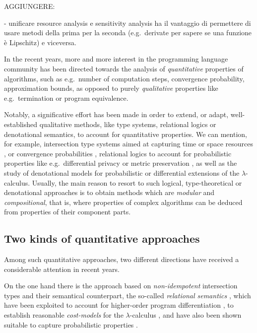 {\color{red}
AGGIUNGERE:

- unificare resource analysis e sensitivity analysis ha il vantaggio di permettere di usare metodi della prima per la seconda (e.g.~derivate per sapere se una funzione è Lipschitz) e viceversa.

}

In the recent years, more and more interest in the programming language community has been directed towards the analysis of \emph{quantitative} properties of algorithms, such as e.g.~number of computation steps, convergence probability, 
approximation bounds, 
as opposed to purely \emph{qualitative} properties like e.g.~termination or program equivalence. 

Notably, a significative effort has been made in order to extend, or adapt, well-established qualitative methods, like type systems, relational logics or denotational semantics, to account for quantitative properties. We can mention, for example, 
intersection type systems aimed at capturing time or space resources \cite{Beniamino}, or convergence probabilities \cite{UgoBreuvart, LICS2022},  relational logics to account for probabilistic properties like e.g.~differential privacy \cite{Barthes} or metric preservation \cite{Reed2010, dallago}, as well as the study of denotational models for 
probabilistic \cite{PCOH, QBS} or differential \cite{difflambda} extensions of the $\lambda$-calculus. 
Usually, the main reason to resort to such logical, type-theoretical or denotational approaches is to obtain methods which are \emph{modular} and \emph{compositional}, that is, where properties of complex algorithms can be deduced from properties of their component parts.   

\subsection{Two kinds of quantitative approaches}

Among such quantitative approaches, two different directions have received a considerable attention in recent years. 

On the one hand there is the approach based on \emph{non-idempotent} intersection types \cite{} and their semantical counterpart, the so-called \emph{relational semantics} \cite{}, which have been exploited to account for higher-order program differentiation \cite{difflambda}, to establish reasonable \emph{cost-models} for the $\lambda$-calculus \cite{}, and have also been shown suitable to capture probabilistic properties \cite{Manzo}. 

